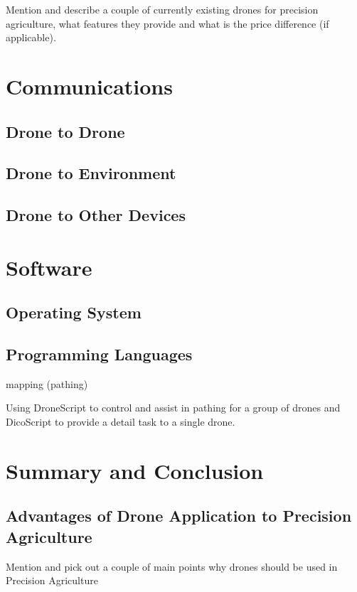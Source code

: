 \documentclass[11pt,a5paper,footinclude=true,headinclude=true, oneside]{scrbook}
\begin{document}
Mention and describe a couple of currently existing drones for precision agriculture, what features they provide and what is the price difference (if applicable).


\chapter{Communications}
\section{Drone to Drone}

\section{Drone to Environment}

\section{Drone to Other Devices}


\chapter{Software}
\section{Operating System}

\section{Programming Languages}

mapping (pathing)

Using DroneScript to control and assist in pathing for a group of drones and DicoScript to provide a detail task to a single drone. \cite{alwateer_enabling_2019}

\chapter{Summary and Conclusion}

\section{Advantages of Drone Application to Precision Agriculture}

    Mention and pick out a couple of main points why drones should be used in Precision Agriculture
\end{document}
